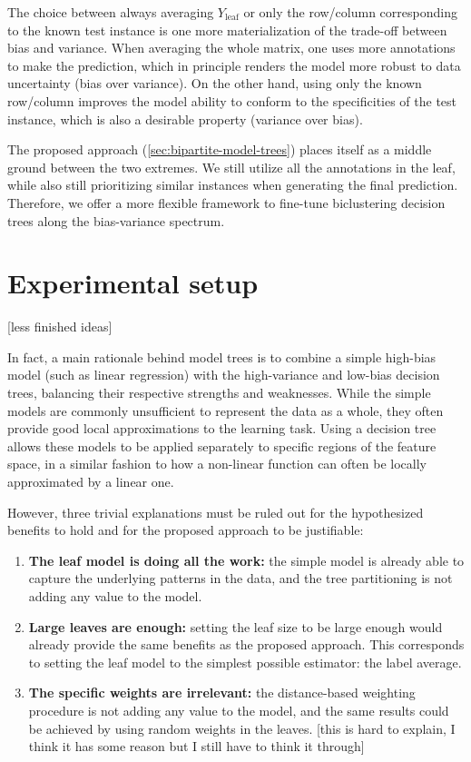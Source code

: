 \documentclass{article}
\begin{document}
The choice between always averaging $Y_\text{leaf}$ or only the row/column corresponding to the known test instance is one more materialization of the trade-off between bias and variance. When averaging the whole matrix, one uses more annotations to make the prediction, which in principle renders the model more robust to data uncertainty (bias over variance). On the other hand, using only the known row/column improves the model ability to conform to the specificities of the test instance, which is also a desirable property (variance over bias).

The proposed approach (\autoref{sec:bipartite-model-trees}) places itself as a middle ground between the two extremes. We still utilize all the annotations in the leaf, while also still prioritizing similar instances when generating the final prediction. Therefore, we offer a more flexible framework to fine-tune biclustering decision trees along the bias-variance spectrum.

\section{Experimental setup}
[less finished ideas]

In fact, a main rationale behind model trees is to combine a simple high-bias model (such as linear regression) with the high-variance and low-bias decision trees, balancing their respective strengths and weaknesses. While the simple models are commonly unsufficient to represent the data as a whole, they often provide good local approximations to the learning task. Using a decision tree allows these models to be applied separately to specific regions of the feature space, in a similar fashion to how a non-linear function can often be locally approximated by a linear one.


However, three trivial explanations must be ruled out for the hypothesized benefits to hold and for the proposed approach to be justifiable:
%
\begin{enumerate}
    \item \textbf{The leaf model is doing all the work:} the simple model is already able to capture the underlying patterns in the data, and the tree partitioning is not adding any value to the model.
    \item \textbf{Large leaves are enough:} setting the leaf size to be large enough would already provide the same benefits as the proposed approach. This corresponds to setting the leaf model to the simplest possible estimator: the label average.
    \item \textbf{The specific weights are irrelevant:} the distance-based weighting procedure is not adding any value to the model, and the same results could be achieved by using random weights in the leaves. [this is hard to explain, I think it has some reason but I still have to think it through]
\end{enumerate}
\end{document}
